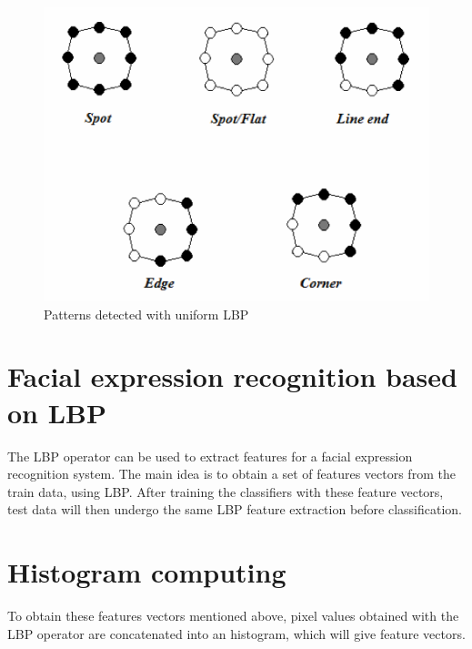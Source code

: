 \begin{figure}[!h]
\begin{center}
\noindent \includegraphics[scale=0.8]{figures/lbp_structural_features} 
\newline
\caption{Patterns detected with uniform LBP}
\label{lbp_structural_features}
\end{center} 
\end{figure}

\section{Facial expression recognition based on LBP}

\vspace{\baselineskip}
\noindent The LBP operator can be used to extract features for a facial expression recognition system. The main idea is to obtain a set of features vectors from the train data, using LBP. After training the classifiers with these feature vectors, test data will then undergo the same LBP feature extraction before classification. 
\newline

\section{Histogram computing}

\vspace{\baselineskip}
\noindent To obtain these features vectors mentioned above, pixel values obtained with the LBP operator are concatenated into an histogram, which will give feature vectors.
\newline

